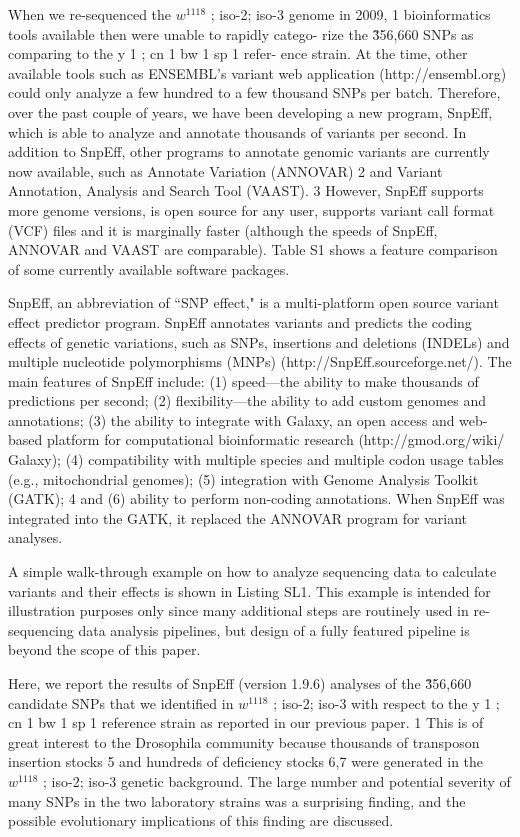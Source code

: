 When we re-sequenced the $w^{1118}$ ; iso-2; iso-3 genome in 2009, 1 bioinformatics tools available then were unable to rapidly catego- rize the \~356,660 SNPs as comparing to the y 1 ; cn 1 bw 1 sp 1 refer- ence strain. At the time, other available tools such as ENSEMBL’s variant web application (http://ensembl.org) could only analyze a few hundred to a few thousand SNPs per batch. Therefore, over the past couple of years, we have been developing a new program, SnpEff, which is able to analyze and annotate thousands of variants per second. In addition to SnpEff, other programs to annotate genomic variants are currently now available, such as Annotate Variation (ANNOVAR) 2 and Variant Annotation, Analysis and Search Tool (VAAST). 3 However, SnpEff supports more genome versions, is open source for any user, supports variant call format (VCF) files and it is marginally faster (although the speeds of SnpEff, ANNOVAR and VAAST are comparable). Table S1 shows a feature comparison of some currently available software packages.

SnpEff, an abbreviation of ``SNP effect," is a multi-platform open source variant effect predictor program. SnpEff annotates variants and predicts the coding effects of genetic variations, such as SNPs, insertions and deletions (INDELs) and multiple nucleotide polymorphisms (MNPs) (http://SnpEff.sourceforge.net/).  The main features of SnpEff include: (1) speed—the ability to make thousands of predictions per second; (2) flexibility—the ability to add custom genomes and annotations; (3) the ability to integrate with Galaxy, an open access and web-based platform for computational bioinformatic research (http://gmod.org/wiki/ Galaxy); (4) compatibility with multiple species and multiple codon usage tables (e.g., mitochondrial genomes); (5) integration with Genome Analysis Toolkit (GATK); 4 and (6) ability to perform non-coding annotations. When SnpEff was integrated into the GATK, it replaced the ANNOVAR program for variant analyses.

A simple walk-through example on how to analyze sequencing data to calculate variants and their effects is shown in Listing SL1. This example is intended for illustration purposes only since many additional steps are routinely used in re-sequencing data analysis pipelines, but design of a fully featured pipeline is beyond the scope of this paper.

Here, we report the results of SnpEff (version 1.9.6) analyses of the \~356,660 candidate SNPs that we identified in $w^{1118}$ ; iso-2; iso-3 with respect to the y 1 ; cn 1 bw 1 sp 1 reference strain as reported in our previous paper. 1 This is of great interest to the Drosophila community because thousands of transposon insertion stocks 5 and hundreds of deficiency stocks 6,7 were generated in the $w^{1118}$ ; iso-2; iso-3 genetic background. The large number and potential severity of many SNPs in the two laboratory strains was a surprising finding, and the possible evolutionary implications of this finding are discussed.

